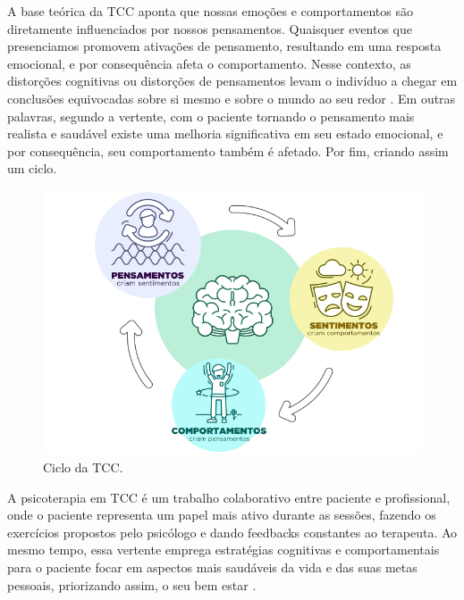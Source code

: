 A base teórica da TCC aponta que nossas emoções e comportamentos são diretamente influenciados por nossos pensamentos. Quaisquer eventos que presenciamos promovem ativações de pensamento, resultando em uma resposta emocional, e por consequência afeta o comportamento. Nesse contexto, as distorções cognitivas ou distorções de pensamentos levam o indivíduo a chegar em conclusões equivocadas sobre si mesmo e sobre o mundo ao seu redor \cite{Education2023}. Em outras palavras, segundo a vertente, com o paciente tornando o pensamento mais realista e saudável existe uma melhoria significativa em seu estado emocional, e por consequência, seu comportamento também é afetado. Por fim, criando assim um ciclo. 

\begin{figure}[H]
    \centering
    \caption{Ciclo da TCC.}
    \label{fig:cicloTCC}
    \includegraphics[width=.8\textwidth]{data/figures/tcc-esquema.png}
\end{figure}

A psicoterapia em TCC é um trabalho colaborativo entre paciente e profissional, onde o paciente representa um papel mais ativo durante as sessões, fazendo os exercícios propostos pelo psicólogo e dando feedbacks constantes ao terapeuta. Ao mesmo tempo, essa vertente emprega estratégias cognitivas e comportamentais para o paciente focar em aspectos mais saudáveis da vida e das suas metas pessoais, priorizando assim, o seu bem estar \cite{Education2023}.